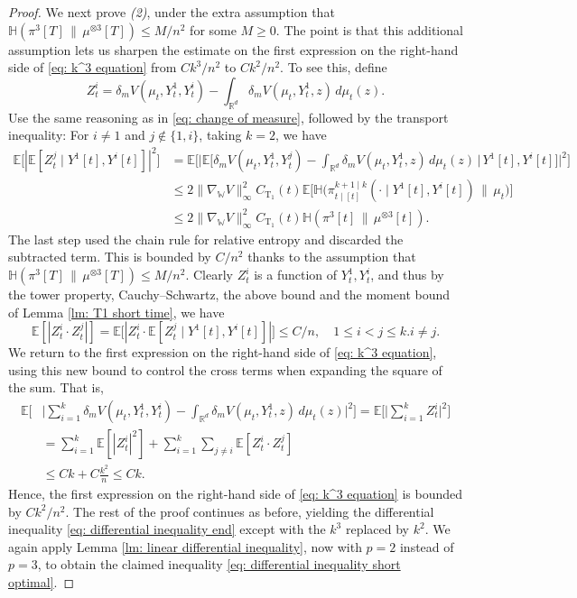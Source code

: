\documentclass[11pt,reqno]{amsart}
\numberwithin{equation}{section}
\theoremstyle{definition}
\def\E{{\mathbb E}}
\def\R{{\mathbb R}}
\newcommand{\wgrad}{\nabla_{\W}}
\newcommand{\W}{\mathbb W}
\newcommand{\ent}{ \mathbb H}
\begin{document}
\begin{proof}
We next prove \textit{(2)}, under the extra assumption that $\ent(\pi^{3}[T]\,\|\,\mu^{\otimes 3}[T])\leq M/n^2$ for some $M\geq 0$. The point is that this additional assumption lets us sharpen the estimate on the first expression on the right-hand side of \eqref{eq: k^3 equation} from $Ck^3/n^2$ to $Ck^2/n^2$. To see this, define
\[
Z_t^i= \delta_m  V(\mu_t,Y_t^1,Y_t^i)-\int_{\R^d} \delta_m  V(\mu_t,Y_t^1,z)\,d\mu_t(z).
\] 
Use the same reasoning as in \eqref{eq: change of measure}, followed by the transport inequality: For $i \neq 1$ and $j \notin \{1,i\}$, taking $k=2$, we have
\begin{align*}
    \E\Big[|\E[Z_t^j \mid Y^1[t],Y^i[t]]|^2\Big]&= \E\bigg[\Big|\E\Big[\delta_m  V(\mu_t,Y_t^1,Y_t^j)-\int_{\R^d} \delta_m  V(\mu_t,Y_t^1,z)\,d\mu_t(z)\,\Big\vert\, Y^1[t],Y^i[t]\Big]\Big|^2\bigg]\\
    &\leq 2\|\wgrad V\|_\infty^2 C_{\text{T}_1}(t) \E\Big[\ent\Big(\pi_{t\mid [t]}^{k+1\mid k}(\cdot\mid Y^{1}[t],Y^{i}[t])\,\big\|\,\mu_t\Big)\Big]\\
    &\leq 2\|\wgrad V\|_\infty^2 C_{\text{T}_1}(t) \ent(\pi^3[t]\,\|\,\mu^{\otimes 3}[t]).
\end{align*}
The last step used  the chain rule for relative entropy and discarded the subtracted term. This is bounded by $C/n^2$ thanks to the assumption that $\ent(\pi^{3}[T]\,\|\,\mu^{\otimes 3}[T])\leq M/n^2$.
Clearly $Z_t^i$ is a function of $Y_t^1,Y_t^i$, and thus by the tower property, Cauchy--Schwartz, the above bound and the moment bound of Lemma \ref{lm: T1 short time}, we have
\[
\E[|Z_t^i \cdot Z_t^j|]=\E\big[|Z_t^i \cdot \E[Z_t^j \mid Y^1[t],Y^i[t]]|\big] \leq C/n, \quad 1 \le i < j \le k.i \neq j.
\]
We return to the first expression on the right-hand side of \eqref{eq: k^3 equation}, using this new bound to control the cross terms when  expanding the  square of the sum. That is, 
\begin{align*}
\E\bigg[ &\Big|\sum_{i=1}^k \delta_m  V(\mu_t,Y_t^1,Y_t^i)-\int_{\R^d} \delta_m  V(\mu_t,Y_t^1,z)\,d\mu_t(z)\Big|^2\bigg] = \E\bigg[\Big|\sum_{i=1}^k Z_t^i \Big|^2\bigg] \\
    &= \sum_{i=1}^k \E[|Z_t^i|^2] +  \sum_{i=1}^k \sum_{j \neq i}\E[Z_t^i \cdot Z_t^j] \\
    &\leq Ck +C\frac{k^2}{n} \le Ck.
    \end{align*}
    Hence, the first expression on the right-hand side of \eqref{eq: k^3 equation} is bounded by $Ck^2/n^2$.
The rest of the proof continues as before, yielding the differential inequality \eqref{eq: differential inequality end} except with the $k^3$ replaced by $k^2$. We again apply Lemma \ref{lm: linear differential inequality}, now with $p=2$ instead of $p=3$, to obtain the  claimed inequality \eqref{eq: differential inequality short optimal}.
\end{proof}
\end{document}
